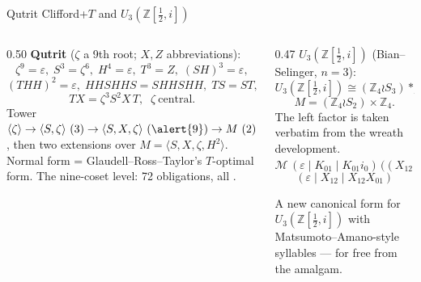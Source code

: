 \begin{frame}{Qutrit Clifford+$T$ and $U_3(\mathbb{Z}[\frac12,i])$ \InPaper}
\begin{columns}[T]
\begin{column}{0.50\textwidth}
\textbf{Qutrit} ($\zeta$ a 9th root; $X,Z$ abbreviations):
\[
  \zeta^9 = \varepsilon,\;
  S^3 = \zeta^6,\;
  H^4 = \varepsilon,\;
  T^3 = Z,\;
  (SH)^3 = \varepsilon,
\]
\[
  (THH)^2 = \varepsilon,\;
  HHSHHS = SHHSHH,\;
  TS = ST,
\]
\[
  TX = \zeta^3 S^2 X\, T,\;\;
  \zeta\ \text{central}.
\]
Tower $\langle\zeta\rangle \to \langle S,\zeta\rangle\ (3) \to \langle S,X,\zeta\rangle\
(\alert{9}) \to M\ (2)$, then two extensions over $M = \langle S,X,\zeta,H^2\rangle$.
Normal form = Glaudell--Ross--Taylor's $T$-optimal form.
The nine-coset level: \alert{72} obligations, all .
\end{column}
\begin{column}{0.47\textwidth}
\textbf{$U_3(\mathbb{Z}[\frac12,i])$} (Bian--Selinger, $n=3$):
\[
  U_3(\mathbb{Z}[\tfrac12,i]) \cong
  (\mathbb{Z}_4 \wr S_3) \ast_{M} \langle M, K_{01} \rangle,
\]
\[ M = (\mathbb{Z}_4 \wr S_2) \times \mathbb{Z}_4 . \]
The left factor is taken \alert{verbatim} from the wreath development.
\[
  \mathcal{M}\,(\varepsilon \mid K_{01} \mid K_{01} i_0)\,
  \bigl((X_{12} \mid X_{12}X_{01})(K_{01} \mid K_{01} i_0)\bigr)^{*}
\]
\[ (\varepsilon \mid X_{12} \mid X_{12}X_{01}) \]
\begin{newdevbox}
\small A \alert{new canonical form} for $U_3(\mathbb{Z}[\frac12,i])$ with
Matsumoto--Amano-style syllables --- for free from the amalgam.
\end{newdevbox}
\end{column}
\end{columns}
\end{frame}

